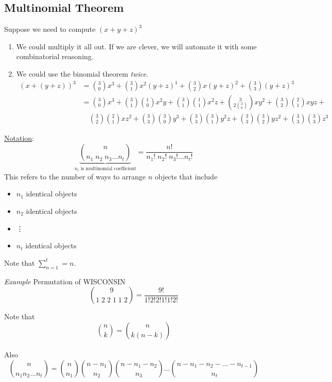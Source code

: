\documentclass[12pt]{article}
\begin{document}
\vspace{1.5\baselineskip}
\subsection{Multinomial Theorem}
Suppose we need to compute $(x+y+z)^3$
\begin{enumerate}
    \item We could multiply it all out. If we are clever, we will automate it with some combinatorial reasoning.
    \item We could use the binomial theorem {\sl twice}.
    \begin{align*}
        (x+(y+z))^3 &= \binom{3}{0}x^3+\binom{3}{1}x^2(y+z)^1 + \binom{3}{2}x(y+z)^2+\binom{3}{3}(y+z)^3 \\
        &= \binom{3}{0}x^3 + \binom{3}{1}\binom{1}{0}x^2y +\binom{3}{1}\binom{1}{1}x^2z+\binom{3}{2\binom{2}0}xy^2+\binom{3}{2}\binom{2}{1}xyz+\\
        &\quad\binom{3}{2}\binom{2}{1}xz^2+\binom{3}{3}\binom{3}{0}y^3+\binom{3}{3}\binom{3}{1}y^2z+\binom{3}{3}\binom{3}{2}yz^2+\binom{3}{3}\binom{3}{3}z^3
    \end{align*}
\end{enumerate}

\vspace{1.5\baselineskip}
\underline{Notation}: $$\underbrace{\binom{n}{n_1\;n_2\;n_3\ldots n_t}}_{\text{$n_i$ is multinomial coefficient}} = \frac{n!}{n_1!\;n_2!\;n_3!\ldots n_t!}$$
This refers to the number of ways to arrange $n$ objects that include 
\begin{itemize}
    \item[] $n_1$ identical objects
    \item[] $n_2$ identical objects
    \item[] \qquad\qquad\vdots
    \item[] $n_t$ identical objects
\end{itemize}
Note that $\sum\limits_{n=1}^t=n$.

\vspace{1.5\baselineskip}
{\sl Example} Permutation of WISCONSIN
$$\binom{9}{1\; 2\;2\;1\;1\;2}=\frac{9!}{1!2!2!1!1!2!}$$

\vspace{1.5\baselineskip}
Note that $$\binom{n}{k} = \binom{n}{k(n-k)}$$\\
Also
$$\binom{n}{n_1n_2\ldots n_t} = \binom{n}{n_1}\binom{n-n_1}{n_2}\binom{n-n_1-n_2}{n_3}\ldots\binom{n-n_1-n_2-\ldots-n_{t-1}}{n_t}$$
\end{document}
